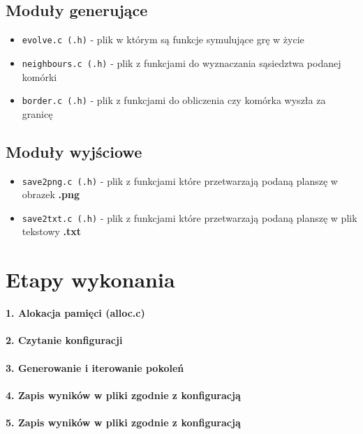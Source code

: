 \documentclass[12pt]{article}
\begin{document}
\subsection{Moduły generujące}
\begin{itemize}
    \item \texttt{evolve.c (.h)} - plik w którym są funkcje symulujące grę w życie
    \item \texttt{neighbours.c (.h)} - plik z funkcjami do wyznaczania sąsiedztwa podanej komórki
    \item \texttt{border.c (.h)} - plik z funkcjami do obliczenia czy komórka wyszła za granicę
\end{itemize}

\subsection{Moduły wyjściowe}
\begin{itemize}
    \item \texttt{save2png.c (.h)} - plik z funkcjami które przetwarzają podaną planszę w obrazek \textbf{.png}
    \item \texttt{save2txt.c (.h)} - plik z funkcjami które przetwarzają podaną planszę w plik tekstowy \textbf{.txt}
    
\end{itemize}

\section{Etapy wykonania}
\textbf{1. Alokacja pamięci (alloc.c)}\\\\
\textbf{2. Czytanie konfiguracji}\\\\
\textbf{3. Generowanie i iterowanie pokoleń}\\\\
\textbf{4. Zapis wyników w pliki zgodnie z konfiguracją}\\\\
\textbf{5. Zapis wyników w pliki zgodnie z konfiguracją}\\\\

    

 
\end{document}
